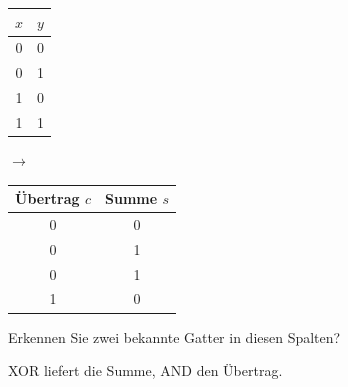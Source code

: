 {
\begin{frame}
\end{frame}}

\begin{frame}
\begin{center}
\begin{tabular}{cc}
    $x$ & $y$ \\\midrule
    0 & 0 \\
    0 & 1 \\
    1 & 0 \\
    1 & 1 \\
\end{tabular}
\quad$\longrightarrow$\quad
\begin{tabular}{cc}
    Übertrag $c$ & Summe $s$ \\\midrule
    0 & 0 \\
    0 & 1 \\
    0 & 1 \\
    1 & 0 \\
\end{tabular}
\end{center}
\begin{center}
Erkennen Sie zwei bekannte Gatter in diesen Spalten?
\end{center}
\end{frame}

\begin{frame}
\begin{center}

\end{center}
\begin{center}XOR liefert die Summe, AND den Übertrag.\end{center}
\end{frame}


